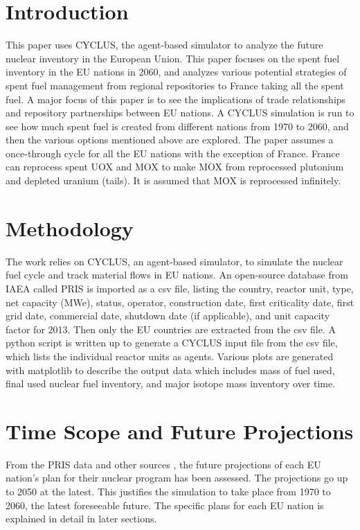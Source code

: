 \section{Introduction}
This paper uses CYCLUS, the agent-based simulator \cite{huff_fundamental_2016} to analyze
the future nuclear inventory in the European Union. This paper focuses on the spent fuel
inventory in the EU nations in 2060, and analyzes various potential strategies of spent fuel
management from regional
repositories to France taking all the spent fuel.
A major focus of this paper is to see the implications of trade
relationships and repository partnerships between EU nations.
A CYCLUS simulation is run to see
how much spent fuel is created from different nations from 1970 to 2060, and then the various
options mentioned above are explored.  The paper assumes a once-through cycle for all the 
EU nations with the exception of France. France can reprocess spent \gls{UOX} and \gls{MOX} to
make \gls{MOX} from reprocessed plutonium and depleted uranium (tails). It is assumed that
\gls{MOX} is reprocessed infinitely. 


\section{Methodology}
The work relies on CYCLUS, an agent-based simulator, to simulate the nuclear fuel cycle
and track material flows in EU nations. An open-source database from \gls{IAEA} called
\gls{PRIS} is imported as a csv file, listing the country, reactor unit, type, net capacity (MWe), status,
operator, construction date, first criticality date, first grid date, commercial date, shutdown
date (if applicable), and unit capacity factor for 2013. Then only the EU countries are extracted
from the csv file. A python script is written up to generate a CYCLUS input file from the csv file,
which lists the individual reactor units as agents. Various plots are 
generated with matplotlib to describe the output data which includes mass of fuel used, final used nuclear fuel
inventory, and major isotope mass inventory over time.


\section{Time Scope and Future Projections}
From the \gls{PRIS} data and other sources \cite{world_nuclear_2017} \cite{joskow_future_2012} \cite{hatch_politics_2013},
the future projections of each EU nation's plan for their nuclear program has been assessed.
The projections go up to 2050 at the latest. This justifies the simulation to take place from
1970 to 2060, the latest foreseeable future. The specific plans for each EU nation is explained
in detail in later sections.


